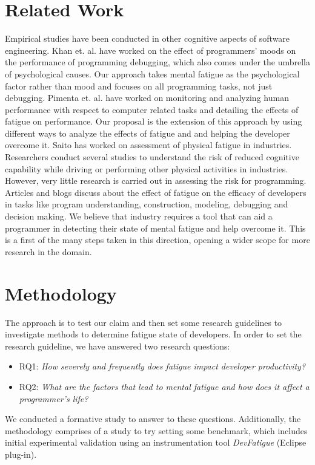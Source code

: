 \documentclass{acm_proc_article-sp}
\begin{document}
\section{Related Work}
Empirical studies have been conducted in other cognitive aspects 
of software engineering. Khan et. al. \cite{khan:mood} have worked on the effect 
of programmers' moods on the performance of programming debugging, 
which also comes under the umbrella of psychological causes. 
Our approach takes mental fatigue as the psychological factor 
rather than mood and focuses on all programming tasks, not just debugging.
Pimenta et. al. \cite{pimenta:monitor} \cite{pimenta:analysis} have worked on
monitoring and analyzing human performance with respect to computer related
tasks and detailing the effects of fatigue on performance. Our proposal is the
extension of this approach by using different ways to analyze the effects of
fatigue and and helping the developer overcome it. Saito \cite{saito:industry}
has worked on assessment of physical fatigue in industries. Researchers
conduct several studies to understand the risk of reduced cognitive capability
while driving or performing other physical activities in industries. However,
very little research is carried out in assessing the risk for programming.
Articles \cite{website:blog-decision} and blogs \cite{website:blog-fatigue}
discuss about the effect of fatigue on the efficacy of developers in tasks like
program understanding, construction, modeling, debugging and decision making.
We believe that industry requires a tool that can aid a programmer in detecting
their state of mental fatigue and help overcome it. This is a first of the many
steps taken in this direction, opening a wider scope for more research in the
domain.

\section{Methodology}
The approach is to test our claim and then set some research
guidelines to investigate methods to determine fatigue state of developers. In
order to set the research guideline, we have answered two research questions:
\begin{itemize}
  \item RQ1: \textit{How severely and frequently does fatigue impact developer
  productivity?}
  \item RQ2: \textit{What are the factors that lead to mental fatigue and
  how does it affect a programmer's life?}
\end{itemize}
We conducted a formative study to answer to these questions.
Additionally, the methodology comprises of a study to try setting some
benchmark, which includes initial experimental validation using an
instrumentation tool \textit{DevFatigue} (Eclipse plug-in).\\
\end{document}
